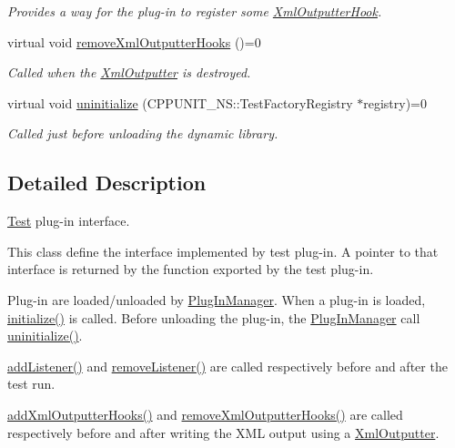 \begin{DoxyCompactItemize}
\begin{DoxyCompactList}\small\item\em Provides a way for the plug-\/in to register some \hyperlink{class_xml_outputter_hook}{Xml\-Outputter\-Hook}. \end{DoxyCompactList}\item 
virtual void \hyperlink{struct_cpp_unit_test_plug_in_a045727ad9658525838b0b9157065fbcd}{remove\-Xml\-Outputter\-Hooks} ()=0
\begin{DoxyCompactList}\small\item\em Called when the \hyperlink{class_xml_outputter}{Xml\-Outputter} is destroyed. \end{DoxyCompactList}\item 
virtual void \hyperlink{struct_cpp_unit_test_plug_in_a8628d2026e76c58f715e17af88f77458}{uninitialize} (C\-P\-P\-U\-N\-I\-T\-\_\-\-N\-S\-::\-Test\-Factory\-Registry $\ast$registry)=0
\begin{DoxyCompactList}\small\item\em Called just before unloading the dynamic library. \end{DoxyCompactList}\end{DoxyCompactItemize}


\subsection{Detailed Description}
\hyperlink{class_test}{Test} plug-\/in interface.

This class define the interface implemented by test plug-\/in. A pointer to that interface is returned by the function exported by the test plug-\/in. 

Plug-\/in are loaded/unloaded by \hyperlink{class_plug_in_manager}{Plug\-In\-Manager}. When a plug-\/in is loaded, \hyperlink{struct_cpp_unit_test_plug_in_aec670330e7fced26c2a66b1dcd56edc0}{initialize()} is called. Before unloading the plug-\/in, the \hyperlink{class_plug_in_manager}{Plug\-In\-Manager} call \hyperlink{struct_cpp_unit_test_plug_in_a8628d2026e76c58f715e17af88f77458}{uninitialize()}.

\hyperlink{struct_cpp_unit_test_plug_in_aad8038dc72d0f9798379937fe5692c97}{add\-Listener()} and \hyperlink{struct_cpp_unit_test_plug_in_a8f36157014b515d38efbc8ab67923d85}{remove\-Listener()} are called respectively before and after the test run.

\hyperlink{struct_cpp_unit_test_plug_in_a547cfddd0513dc9182721f723e27d9e3}{add\-Xml\-Outputter\-Hooks()} and \hyperlink{struct_cpp_unit_test_plug_in_a045727ad9658525838b0b9157065fbcd}{remove\-Xml\-Outputter\-Hooks()} are called respectively before and after writing the X\-M\-L output using a \hyperlink{class_xml_outputter}{Xml\-Outputter}.

